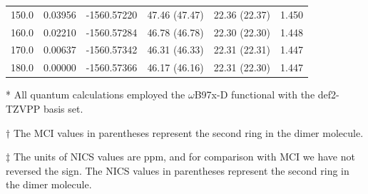 \begin{table}[hbt!]
\begin{threeparttable}
\begin{tabular}{cccccc}
150.0 & 0.03956 & -1560.57220 & 47.46 (47.47) & 22.36 (22.37) & 1.450 \\
160.0 & 0.02210 & -1560.57284 & 46.78 (46.78) & 22.30 (22.30) & 1.448 \\
170.0 & 0.00637 & -1560.57342 & 46.31 (46.33) & 22.31 (22.31) & 1.447 \\
180.0 & 0.00000 & -1560.57366 & 46.17 (46.16) & 22.31 (22.30) & 1.447 \\ \bottomrule
\end{tabular}
\begin{tablenotes}
\item[*] \footnotesize All quantum calculations employed the $\omega$B97x-D functional with the def2-TZVPP basis set.
\item [$\dagger$] \footnotesize The MCI values in parentheses represent the second ring in the dimer molecule.
\item [$\ddagger$] \footnotesize The units of NICS values are ppm, and for comparison with MCI we have not reversed the sign. The NICS values in parentheses represent the second ring in the dimer molecule.
\end{tablenotes}
\end{threeparttable}
\end{table}

